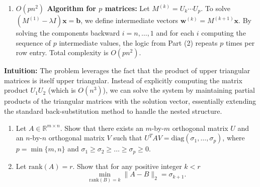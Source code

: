 \begin{solution}
\begin{enumerate}
    \item \textbf{$O(pn^2)$ Algorithm for $p$ matrices:} Let $M^{(k)} = U_k \cdots U_p$. To solve $(M^{(1)} - \lambda I) \mathbf{x} = \mathbf{b}$, we define intermediate vectors $\mathbf{w}^{(k)} = M^{(k+1)} \mathbf{x}$. By solving the components backward $i=n, \dots, 1$ and for each $i$ computing the sequence of $p$ intermediate values, the logic from Part (2) repeats $p$ times per row entry. Total complexity is $O(p n^2)$.
\end{enumerate}

\textbf{Intuition:}
The problem leverages the fact that the product of upper triangular matrices is itself upper triangular. Instead of explicitly computing the matrix product $U_1 U_2$ (which is $O(n^3)$), we can solve the system by maintaining partial products of the triangular matrices with the solution vector, essentially extending the standard back-substitution method to handle the nested structure.
\end{solution}

\begin{exercise}
\label{applied:2010:6}
\begin{enumerate}
    \item Let $A \in \mathbb{R}^{m \times n}$. Show that there exists an $m$-by-$m$ orthogonal matrix $U$ and an $n$-by-$n$ orthogonal matrix $V$ such that $U^T A V = \text{diag}(\sigma_1, \dots, \sigma_p)$, where $p = \min\{m, n\}$ and $\sigma_1 \geq \sigma_2 \geq \dots \geq \sigma_p \geq 0$.

    \item Let $\text{rank}(A) = r$. Show that for any positive integer $k < r$
    \[
    \min_{\text{rank}(B) = k} \| A - B \|_2 = \sigma_{k+1}.
    \]
\end{enumerate}
\end{exercise}

